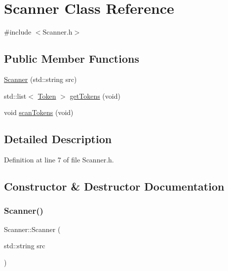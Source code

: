 \hypertarget{classScanner}{}\section{Scanner Class Reference}
\label{classScanner}


{\ttfamily \#include $<$Scanner.\+h$>$}

\subsection*{Public Member Functions}
\begin{DoxyCompactItemize}
\item 
\hyperlink{classScanner_a149fab95f2549cf7d8405c79190c9903}{Scanner} (std\+::string src)
\item 
std\+::list$<$ \hyperlink{classToken}{Token} $>$ \hyperlink{classScanner_aefda786435557ddefd93791e890adfe6}{get\+Tokens} (void)
\item 
void \hyperlink{classScanner_a38e0f484bb3539944d6809c552f1da0b}{scan\+Tokens} (void)
\end{DoxyCompactItemize}


\subsection{Detailed Description}


Definition at line 7 of file Scanner.\+h.



\subsection{Constructor \& Destructor Documentation}
\mbox{\label{classScanner_a149fab95f2549cf7d8405c79190c9903}} 
\subsubsection{\texorpdfstring{Scanner()}{Scanner()}}
{\footnotesize\ttfamily Scanner\+::\+Scanner (\begin{DoxyParamCaption}\item[{std\+::string}]{src }\end{DoxyParamCaption})\hspace{0.3cm}{\ttfamily [explicit]}}



